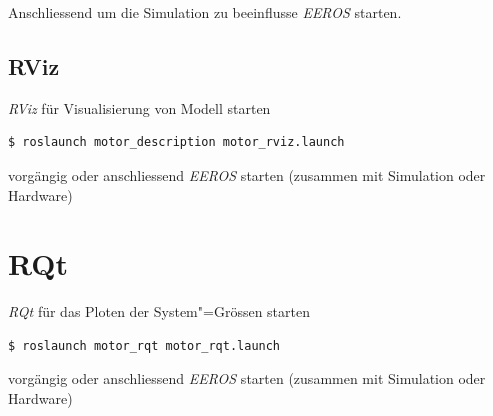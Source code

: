 Anschliessend um die Simulation zu beeinflusse \textit{EEROS} starten.

\subsection{RViz}
\textit{RViz} für Visualisierung von Modell starten
\begin{lstlisting}
$ roslaunch motor_description motor_rviz.launch
\end{lstlisting}
vorgängig oder anschliessend \textit{EEROS} starten (zusammen mit Simulation oder Hardware)


\section{RQt}
\textit{RQt} für das Ploten der System"=Grössen starten
\begin{lstlisting}
$ roslaunch motor_rqt motor_rqt.launch
\end{lstlisting}
vorgängig oder anschliessend \textit{EEROS} starten (zusammen mit Simulation oder Hardware)
